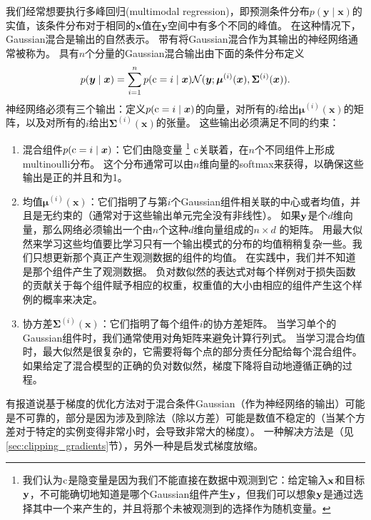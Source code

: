
我们经常想要执行多峰回归(multimodal regression)，即预测条件分布$p(\bm{y}\mid\bm{x})$的实值，该条件分布对于相同的$\bm{x}$值在$\bm{y}$空间中有多个不同的峰值。
在这种情况下，Gaussian混合是输出的自然表示\citep{Jacobs-nc91,bishop1994mixture}。
带有将Gaussian混合作为其输出的神经网络通常被称为。
具有$n$个分量的Gaussian混合输出由下面的条件分布定义
\begin{equation}
p(\bm{y}\mid\bm{x}) = \sum_{i=1}^n p(\mathrm{c} = i \mid \bm{x}) \mathcal{N}(\bm{y}; \bm{\mu}^{(i)}(\bm{x}), \bm{\Sigma}^{(i)}(\bm{x})).
\end{equation}
神经网络必须有三个输出：定义$p(\mathrm{c}=i\mid\bm{x})$的向量，对所有的$i$给出$\bm{\mu}^{(i)}(\bm{x})$的矩阵，以及对所有的$i$给出$\bm{\Sigma}^{(i)}(\bm{x})$的张量。
这些输出必须满足不同的约束：
\begin{enumerate}
\item 混合组件$p(\mathrm{c}=i\mid\bm{x})$：它们由隐变量
\footnote{我们认为$\mathrm{c}$是隐变量是因为我们不能直接在数据中观测到它：给定输入$\mathbf{x}$和目标$\mathbf{y}$，不可能确切地知道是哪个Gaussian组件产生$\mathbf{y}$，但我们可以想象$\mathbf{y}$是通过选择其中一个来产生的，并且将那个未被观测到的选择作为随机变量。}
$\mathrm{c}$关联着，在$n$个不同组件上形成multinoulli分布。
这个分布通常可以由$n$维向量的softmax来获得，以确保这些输出是正的并且和为1。

\item 均值$\bm{\mu}^{(i)}(\bm{x})$：它们指明了与第$i$个Gaussian组件相关联的中心或者均值，并且是无约束的（通常对于这些输出单元完全没有非线性）。
如果$\mathbf{y}$是个$d$维向量，那么网络必须输出一个由$n$个这种$d$维向量组成的$n\times d$ 的矩阵。
用最大似然来学习这些均值要比学习只有一个输出模式的分布的均值稍稍复杂一些。我们只想更新那个真正产生观测数据的组件的均值。
在实践中，我们并不知道是那个组件产生了观测数据。
负对数似然的表达式对每个样例对于损失函数的贡献关于每个组件赋予相应的权重，权重值的大小由相应的组件产生这个样例的概率来决定。

\item 协方差$\bm{\Sigma}^{(i)}(\bm{x})$：它们指明了每个组件$i$的协方差矩阵。
当学习单个的Gaussian组件时，我们通常使用对角矩阵来避免计算行列式。
当学习混合均值时，最大似然是很复杂的，它需要将每个点的部分责任分配给每个混合组件。
如果给定了混合模型的正确的负对数似然，梯度下降将自动地遵循正确的过程。
\end{enumerate}
有报道说基于梯度的优化方法对于混合条件Gaussian（作为神经网络的输出）可能是不可靠的，部分是因为涉及到除法（除以方差）可能是数值不稳定的（当某个方差对于特定的实例变得非常小时，会导致非常大的梯度）。
一种解决方法是（见\ref{sec:clipping_gradients}节），另外一种是启发式梯度放缩\citep{Uria+al-ICML2014}。

